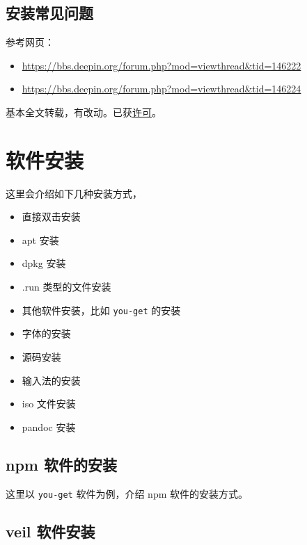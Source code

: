 \documentclass[doctor,openright,twoside]{sjtuthesis}
\providecommand{\tightlist}{%
    \setlength{\itemsep}{0pt}\setlength{\parskip}{0pt}}
\newcommand{\passthrough}[1]{#1}
\theoremstyle{plain}
\theoremstyle{definition}
\theoremstyle{remark}
\theoremstyle{ocrenumbox}
\theoremstyle{plain}
\begin{document}
\hypertarget{section-112}{%
\section{安装常见问题}\label{section-112}}

参考网页：

\begin{itemize}
\tightlist
\item
  \url{https://bbs.deepin.org/forum.php?mod=viewthread\&tid=146222}
\item
  \url{https://bbs.deepin.org/forum.php?mod=viewthread\&tid=146224}
\end{itemize}

基本全文转载，有改动。已获\href{https://bbs.deepin.org/forum.php?mod=viewthread\&tid=146224\&page=1\#pid384937}{许可}。

\hypertarget{software-install}{%
\chapter{软件安装}\label{software-install}}

这里会介绍如下几种安装方式，

\begin{itemize}
\tightlist
\item
  直接双击安装
\item
  apt 安装
\item
  dpkg 安装
\item
  .run 类型的文件安装
\item
  其他软件安装，比如 \passthrough{\lstinline!you-get!} 的安装
\item
  字体的安装
\item
  源码安装
\item
  输入法的安装
\item
  iso 文件安装
\item
  pandoc 安装
\end{itemize}

\hypertarget{npm-}{%
\section{npm 软件的安装}\label{npm-}}

这里以 \passthrough{\lstinline!you-get!} 软件为例，介绍 npm 软件的安装方式。

\hypertarget{veil-}{%
\section{veil 软件安装}\label{veil-}}
\end{document}

